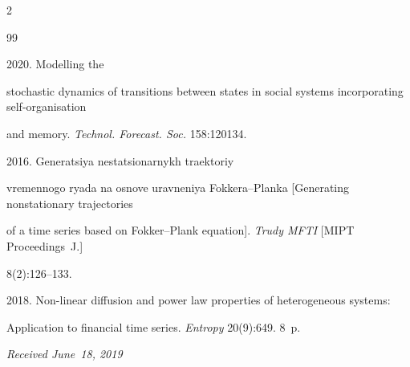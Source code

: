 \begin{multicols}{2}
{{\begin{thebibliography}{99}


 2020. Modelling the 


stochastic dynamics of transitions between states in social systems incorporating self-organisation 


and memory. \textit{Technol. Forecast. Soc.} 158:120134.




 2016. Generatsiya ne\-sta\-tsio\-nar\-nykh traektoriy 


vremennogo ryada na osnove uravneniya Fokkera--Planka [Generating nonstationary trajectories 


of a time series based on Fokker--Plank equation]. \textit{Trudy MFTI} [MIPT Proceedings~J.] 


8(2):126--133.




 2018. Non-linear diffusion and power law properties of heterogeneous systems: 


Application to financial time series. \textit{Entropy} 20(9):649. 8~p.


\end{thebibliography}





 }


 }





\end{multicols}





\vspace*{-3pt}





  \hfill{\small\textit{Received June~18, 2019}}


















\Contr





